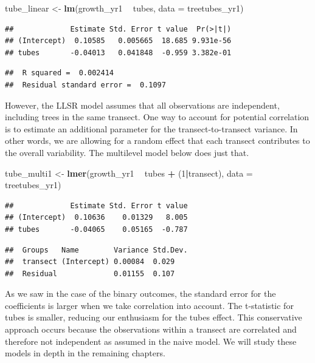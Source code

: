 \documentclass[
]{krantz}
\newenvironment{Shaded}{\begin{snugshade}}{\end{snugshade}}
\newcommand{\DataTypeTok}[1]{\textcolor[rgb]{0.27,0.27,0.27}{#1}}
\newcommand{\DecValTok}[1]{\textcolor[rgb]{0.06,0.06,0.06}{#1}}
\newcommand{\KeywordTok}[1]{\textcolor[rgb]{0.27,0.27,0.27}{\textbf{#1}}}
\newcommand{\NormalTok}[1]{#1}
\newcommand{\OperatorTok}[1]{\textcolor[rgb]{0.43,0.43,0.43}{\textbf{#1}}}
\newcommand{\StringTok}[1]{\textcolor[rgb]{0.5,0.5,0.5}{#1}}
\begin{document}
\begin{Shaded}
\begin{Highlighting}[]
\NormalTok{tube_linear <-}\StringTok{ }\KeywordTok{lm}\NormalTok{(growth_yr1 }\OperatorTok{~}\StringTok{ }\NormalTok{tubes, }\DataTypeTok{data =}\NormalTok{ treetubes_yr1)}
\end{Highlighting}
\end{Shaded}

\begin{verbatim}
##             Estimate Std. Error t value  Pr(>|t|)
## (Intercept)  0.10585   0.005665  18.685 9.931e-56
## tubes       -0.04013   0.041848  -0.959 3.382e-01
\end{verbatim}

\begin{verbatim}
##  R squared =  0.002414 
##  Residual standard error =  0.1097
\end{verbatim}

However, the LLSR model assumes that all observations are independent, including trees in the same transect. One way to account for potential correlation is to estimate an additional parameter for the transect-to-transect variance. In other words, we are allowing for a random effect that each transect contributes to the overall variability. The multilevel model below does just that.

\begin{Shaded}
\begin{Highlighting}[]
\NormalTok{tube_multi1 <-}\StringTok{ }\KeywordTok{lmer}\NormalTok{(growth_yr1 }\OperatorTok{~}\StringTok{ }\NormalTok{tubes }\OperatorTok{+}\StringTok{ }\NormalTok{(}\DecValTok{1}\OperatorTok{|}\NormalTok{transect), }
                    \DataTypeTok{data =}\NormalTok{ treetubes_yr1)}
\end{Highlighting}
\end{Shaded}

\begin{verbatim}
##             Estimate Std. Error t value
## (Intercept)  0.10636    0.01329   8.005
## tubes       -0.04065    0.05165  -0.787
\end{verbatim}

\begin{verbatim}
##  Groups   Name        Variance Std.Dev.
##  transect (Intercept) 0.00084  0.029   
##  Residual             0.01155  0.107
\end{verbatim}

As we saw in the case of the binary outcomes, the standard error for the coefficients is larger when we take correlation into account. The t-statistic for tubes is smaller, reducing our enthusiasm for the tubes effect. This conservative approach occurs because the observations within a transect are correlated and therefore not independent as assumed in the naive model. We will study these models in depth in the remaining chapters.
\end{document}
